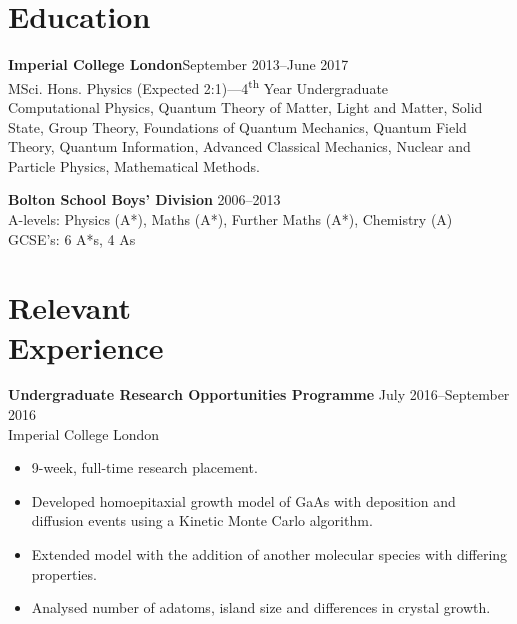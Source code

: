 \documentclass[margin]{res}
\begin{document}
 

 
\address{{\bf Present Address} \\ 119 Latymer Court \\ Hammersmith Road \\ London, W6 7JF}
\address{{\bf Permanent Address} \\ 174 Crompton Way \\ Bolton, BL2 2SA \\}

 
\begin{resume} 
 

\section{Education}
{\bf Imperial College London}\hfill September 2013--June 2017\\
MSci. Hons. Physics (Expected 2:1)---4\textsuperscript{th} Year Undergraduate\\
Computational Physics, Quantum Theory of Matter, Light and Matter, Solid State, Group Theory, Foundations of Quantum Mechanics, Quantum Field Theory, Quantum Information, Advanced Classical Mechanics, Nuclear and Particle Physics, Mathematical Methods.

{\bf Bolton School Boys' Division} \hfill 2006--2013 \\
A-levels: Physics (A*), Maths (A*), Further Maths (A*), Chemistry (A)\\
GCSE's: 6 A*s, 4 As
 

\section{Relevant\\ Experience}

 {\bf Undergraduate Research Opportunities Programme} \hfill July 2016--September 2016\\ Imperial College London
 \begin{itemize} \itemsep -2pt  %
\item 9-week, full-time research placement.
 \item Developed homoepitaxial growth model of GaAs with deposition and diffusion events using a Kinetic Monte Carlo algorithm.
\item Extended model with the addition of another molecular species with differing properties. 
\item Analysed number of adatoms, island size and differences in crystal growth.
\end{itemize}



\end{resume}
\end{document}
